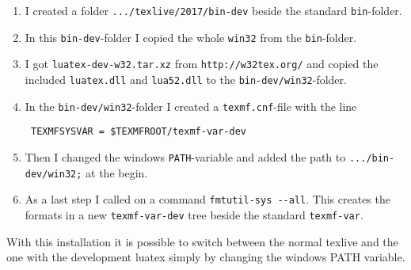 \documentclass[parskip=half-,egregdoesnotlikesansseriftitles]{scrartcl}
\begin{document}
\begin{enumerate}
\item I created a folder \texttt{.../texlive/2017/bin-dev} beside the standard \texttt{bin}-folder. 
\item In this \texttt{bin-dev}-folder I copied the whole \texttt{win32} from the \texttt{bin}-folder.
\item I got \texttt{luatex-dev-w32.tar.xz} from \texttt{http://w32tex.org/} and copied the included \texttt{luatex.dll} and \texttt{lua52.dll} to the \texttt{bin-dev/win32}-folder.
    
\item In the  \texttt{bin-dev/win32}-folder I created a \texttt{texmf.cnf}-file with the line

   \verb+ TEXMFSYSVAR = $TEXMFROOT/texmf-var-dev+
   
\item Then I changed the windows \texttt{PATH}-variable and added the path to \texttt{.../bin-dev/win32;} at the begin.
    
\item As a last step I called on a command \verb+fmtutil-sys --all+. This creates the formats in a new  \texttt{texmf-var-dev} tree beside the standard \texttt{texmf-var}. 
\end{enumerate}   

With this installation it is possible to switch between the normal texlive and the one with the development luatex simply by changing the windows PATH variable. 
\end{document}

